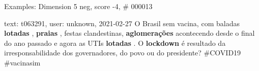\begin{frame}{Examples: Dimension 5 neg, score -4, \# 000013}
\footnotesize
\begin{alertblock}{text: t063291, user: unknown, 2021-02-27}
O Brasil sem vacina, com baladas \textbf{lotadas} , \textbf{praias} , festas 
clandestinas, \textbf{aglomerações} acontecendo desde o final do ano passado e 
agora as UTIs \textbf{lotadas} . O \textbf{lockdown} é resultado da 
irresponsabilidade dos governadores, do povo ou do presidente? \#COVID19 
\#vacinasim 
\end{alertblock}
\end{frame}
